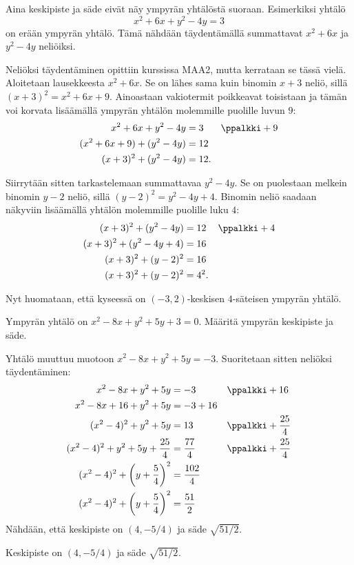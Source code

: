
Aina keskipiste ja säde eivät näy ympyrän yhtälöstä suoraan.
Esimerkiksi yhtälö
\[
x^2+6x+y^2-4y=3
\]
on erään ympyrän yhtälö.
Tämä nähdään täydentämällä summattavat $x^2+6x$ ja $y^2-4y$ neliöiksi.

Neliöksi täydentäminen opittiin kurssissa MAA2, mutta kerrataan se tässä vielä.
Aloitetaan lausekkeesta $x^2+6x$. Se on lähes sama kuin binomin $x+3$ neliö, sillä $(x+3)^2=x^2+6x+9$. Ainoastaan vakiotermit poikkeavat toisistaan ja tämän voi korvata lisäämällä ympyrän yhtälön molemmille puolille luvun $9$: 
\begin{align*}
x^2+6x+y^2-4y &= 3 && \ppalkki +9 \\
(x^2+6x+9)+(y^2-4y) &= 12 && \\
(x+3)^2+(y^2-4y) &= 12.&& 
\end{align*}

Siirrytään sitten tarkastelemaan summattavaa $y^2-4y$. Se on puolestaan melkein binomin $y-2$ neliö, sillä $(y-2)^2=y^2-4y+4$. Binomin neliö saadaan näkyviin lisäämällä yhtälön molemmille puolille luku $4$:
\begin{align*}
(x+3)^2+(y^2-4y) &= 12 && \ppalkki +4\\
(x+3)^2+(y^2-4y+4) &= 16 && \\
(x+3)^2+(y-2)^2 &= 16 && \\
(x+3)^2+(y-2)^2 &= 4^2.&& 
\end{align*}

Nyt huomataan, että kyseessä on $(-3, 2)$-keskisen $4$-säteisen ympyrän yhtälö.

\begin{esimerkki}
Ympyrän yhtälö on $x^2-8x+y^2+5y+3=0$. Määritä ympyrän keskipiste ja säde.
\begin{esimratk}
Yhtälö muuttuu muotoon $x^2-8x+y^2+5y=-3$. Suoritetaan sitten neliöksi täydentäminen:
\begin{align*}
x^2-8x+y^2+5y&=-3 && \ppalkki +16\\
x^2-8x+16+y^2+5y&=-3+16 && \\
(x^2-4)^2+y^2+5y&=13 && \ppalkki +\frac{25}{4}\\
(x^2-4)^2+y^2+5y+\frac{25}{4}&=\frac{77}{4} && \ppalkki +\frac{25}{4}\\
(x^2-4)^2+\left(y+\frac{5}{4}\right)^2&=\frac{102}{4} && \\
(x^2-4)^2+\left(y+\frac{5}{4}\right)^2&=\frac{51}{2} && 
\end{align*}
Nähdään, että keskipiste on $(4, -5/4)$ ja säde $\sqrt{51/2}$.
\end{esimratk}
\begin{esimvast}
Keskipiste on $(4, -5/4)$ ja säde $\sqrt{51/2}$.
\end{esimvast}
\end{esimerkki}

